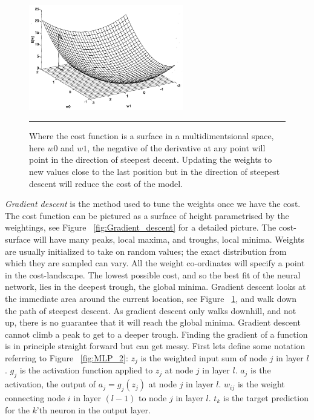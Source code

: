 \begin{figure}[htbp]
	\centering
		\includegraphics[width = 0.6\textwidth]{./Figures/ML_tom_mitchel_gradient_decent.jpg}
		\rule{35em}{0.5pt}
	\caption[Multi-dimentsional gradient descent]{Where the cost function is a surface in a multidimentsional space, here $w0$ and $w1$, the negative of the derivative at any point will point in the direction of steepest decent. Updating the weights to new values close to the last position but in the direction of steepest descent will reduce the cost of the model.}
	\label{fig:Gradient_descent_2}
\end{figure}

\textit{Gradient descent} is the method used to tune the weights once we have the cost.
The cost function can be pictured as a surface of height parametrised by the weightings, see Figure ~\ref{fig:Gradient_descent} for a detailed picture.
The cost-surface will have many peaks, local maxima, and troughs, local minima.
Weights are usually initialized to take on random values; the exact distribution from which they are sampled can vary.
All the weight co-ordinates will specify a point in the cost-landscape.
The lowest possible cost, and so the best fit of the neural network, lies in the deepest trough, the global minima.
Gradient descent looks at the immediate area around the current location, see Figure ~\ref{fig:Gradient_descent_2}, and walk down the path of steepest descent.
As gradient descent only walks downhill, and not up, there is no guarantee that it will reach the global minima.
Gradient descent cannot climb a peak to get to a deeper trough.
Finding the gradient of a function is in principle straight forward but can get messy.
First lets define some notation referring to Figure ~\ref{fig:MLP_2}:
$z_j$ is the weighted input sum of node $j$ in layer $l$.
$g_j$ is the activation function applied to $z_j$ at node $j$ in layer $l$.
$a_j$ is the activation, the output of $a_j = g_j (z_j)$ at node $j$ in layer $l$.
$w_{ij}$ is the weight connecting node $i$ in layer $(l-1)$ to node $j$ in layer $l$.
$t_k$ is the target prediction for the $k$'th neuron in the output layer.

